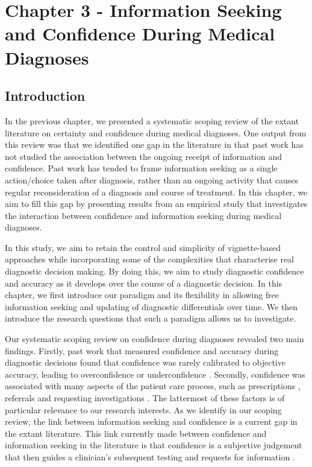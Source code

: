 \documentclass[a4paper, nobind]{templates/ociamthesis}
\begin{document}
\chapter{Chapter 3 - Information Seeking and Confidence During Medical Diagnoses}\label{chapter-3}

\adjustmtc
{}

\section{Introduction}\label{introduction-1}

In the previous chapter, we presented a systematic scoping review of the extant literature on certainty and confidence during medical diagnoses. One output from this review was that we identified one gap in the literature in that past work has not studied the association between the ongoing receipt of information and confidence. Past work has tended to frame information seeking as a single action/choice taken after diagnosis, rather than an ongoing activity that causes regular reconsideration of a diagnosis and course of treatment. In this chapter, we aim to fill this gap by presenting results from an empirical study that investigates the interaction between confidence and information seeking during medical diagnoses.

\hfill\break
In this study, we aim to retain the control and simplicity of vignette-based approaches while incorporating some of the complexities that characterise real diagnostic decision making. By doing this, we aim to study diagnostic confidence and accuracy as it develops over the course of a diagnostic decision. In this chapter, we first introduce our paradigm and its flexibility in allowing free information seeking and updating of diagnostic differentials over time. We then introduce the research questions that such a paradigm allows us to investigate.

\hfill\break
Our systematic scoping review on confidence during diagnoses revealed two main findings. Firstly, past work that measured confidence and accuracy during diagnostic decisions found that confidence was rarely calibrated to objective accuracy, leading to overconfidence \autocite{friedman_physicians_2005,fernandez-aguilar_use_2022,garbayo_metacognitive_2023} or underconfidence \autocite{mann_relationship_1993,yang_effect_2012,brezis_does_2019}. Secondly, confidence was associated with many aspects of the patient care process, such as prescriptions \autocite{levin_antimicrobial_2012,garbayo_metacognitive_2023}, referrals \autocite{calman_variability_1992} and requesting investigations \autocite{tabak_clinical_1996,gupta_associations_2023}. The lattermost of these factors is of particular relevance to our research interests. As we identify in our scoping review, the link between information seeking and confidence is a current gap in the extant literature. This link currently made between confidence and information seeking in the literature is that confidence is a subjective judgement that then guides a clinician's subsequent testing and requests for information \autocite{tabak_clinical_1996,gupta_associations_2023}.\\
\end{document}
